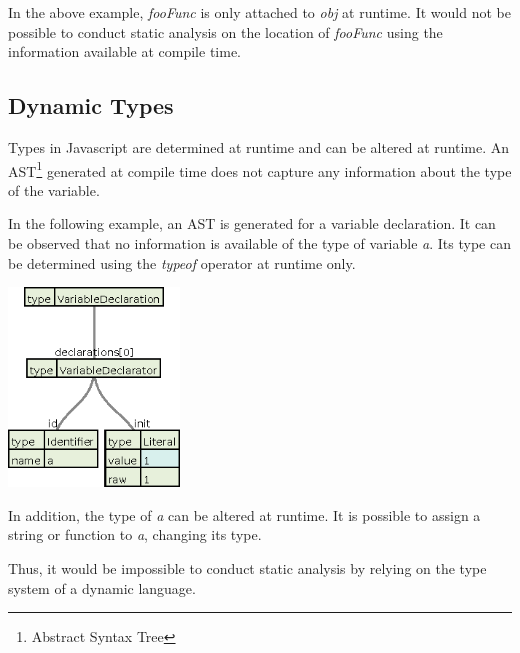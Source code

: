 

In the above example, \textit{fooFunc} is only attached to \textit{obj} at runtime. It would not be possible to conduct static analysis on the location of \textit{fooFunc} using the information available at compile time.

\subsection{Dynamic Types}

Types in Javascript are determined at runtime and can be altered at runtime. An AST\footnote{Abstract Syntax Tree} generated at compile time does not capture any information about the type of the variable.

In the following example, an AST is generated for a variable declaration. It can be observed that no information is available of the type of variable \textit{a}. Its type can be determined using the \textit{typeof} operator at runtime only.



\begin{center}
    \includegraphics[height=150pt]{./images/var_decl.eps}
\end{center}

In addition, the type of \textit{a} can be altered at runtime. It is possible to assign a string or function to \textit{a}, changing its type.



Thus, it would be impossible to conduct static analysis by relying on the type system of a dynamic language.
